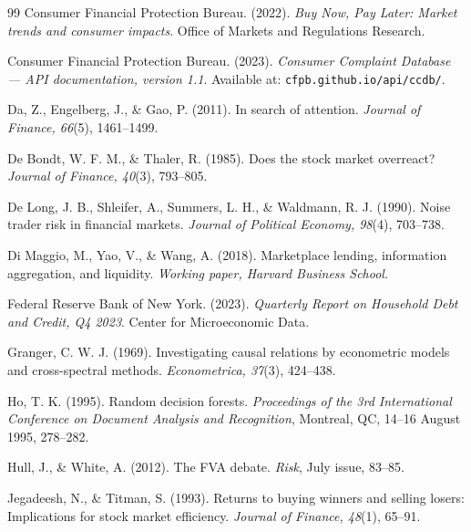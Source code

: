 \documentclass[11pt,a4paper]{article}
\begin{document}
\begin{thebibliography}{99}
Consumer Financial Protection Bureau. (2022).
\textit{Buy Now, Pay Later: Market trends and consumer impacts}.
Office of Markets and Regulations Research.

Consumer Financial Protection Bureau. (2023).
\textit{Consumer Complaint Database --- API documentation, version 1.1}.
Available at: \texttt{cfpb.github.io/api/ccdb/}.

Da, Z., Engelberg, J., \& Gao, P. (2011).
In search of attention.
\textit{Journal of Finance, 66}(5), 1461--1499.

De Bondt, W. F. M., \& Thaler, R. (1985).
Does the stock market overreact?
\textit{Journal of Finance, 40}(3), 793--805.

De Long, J. B., Shleifer, A., Summers, L. H., \& Waldmann, R. J. (1990).
Noise trader risk in financial markets.
\textit{Journal of Political Economy, 98}(4), 703--738.

Di Maggio, M., Yao, V., \& Wang, A. (2018).
Marketplace lending, information aggregation, and liquidity.
\textit{Working paper, Harvard Business School}.

Federal Reserve Bank of New York. (2023).
\textit{Quarterly Report on Household Debt and Credit, Q4 2023}.
Center for Microeconomic Data.

Granger, C. W. J. (1969).
Investigating causal relations by econometric models and cross-spectral methods.
\textit{Econometrica, 37}(3), 424--438.

Ho, T. K. (1995).
Random decision forests.
\textit{Proceedings of the 3rd International Conference on Document Analysis and Recognition}, Montreal, QC, 14--16 August 1995, 278--282.

Hull, J., \& White, A. (2012).
The FVA debate.
\textit{Risk}, July issue, 83--85.

Jegadeesh, N., \& Titman, S. (1993).
Returns to buying winners and selling losers: Implications for stock market efficiency.
\textit{Journal of Finance, 48}(1), 65--91.


\end{thebibliography}
\end{document}
